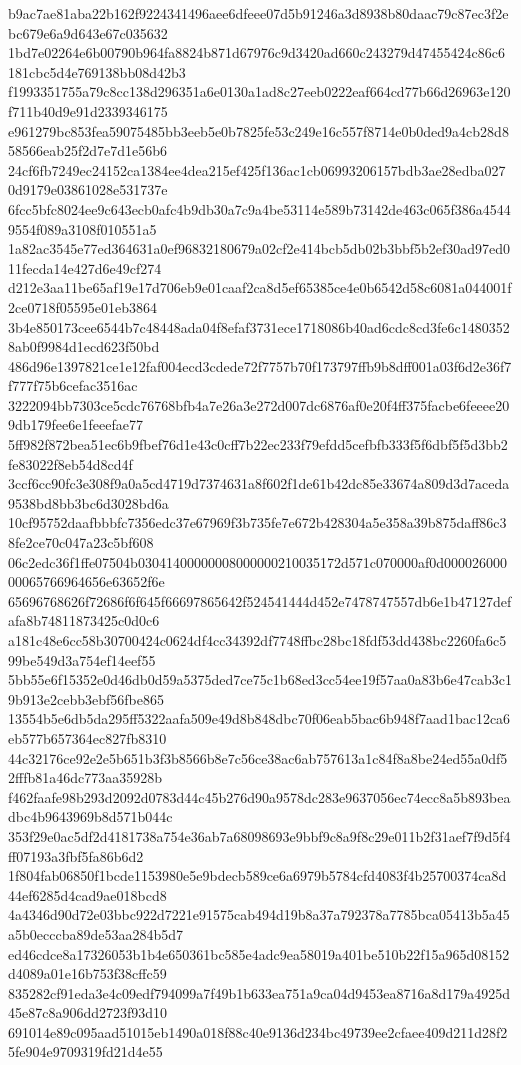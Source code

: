 {b9ac7ae81aba22b162f9224341496aee6dfeee07d5b91246a3d8938b80daac79c87ec3f2ebc679e6a9d643e67c035632
1bd7e02264e6b00790b964fa8824b871d67976c9d3420ad660c243279d47455424c86c6181cbc5d4e769138bb08d42b3
f1993351755a79c8cc138d296351a6e0130a1ad8c27eeb0222eaf664cd77b66d26963e120f711b40d9e91d2339346175
e961279bc853fea59075485bb3eeb5e0b7825fe53c249e16c557f8714e0b0ded9a4cb28d858566eab25f2d7e7d1e56b6
24cf6fb7249ec24152ca1384ee4dea215ef425f136ac1cb06993206157bdb3ae28edba0270d9179e03861028e531737e
6fcc5bfc8024ee9c643ecb0afc4b9db30a7c9a4be53114e589b73142de463c065f386a45449554f089a3108f010551a5
1a82ac3545e77ed364631a0ef96832180679a02cf2e414bcb5db02b3bbf5b2ef30ad97ed011fecda14e427d6e49cf274
d212e3aa11be65af19e17d706eb9e01caaf2ca8d5ef65385ce4e0b6542d58c6081a044001f2ce0718f05595e01eb3864
3b4e850173cee6544b7c48448ada04f8efaf3731ece1718086b40ad6cdc8cd3fe6c14803528ab0f9984d1ecd623f50bd
486d96e1397821ce1e12faf004ecd3cdede72f7757b70f173797ffb9b8dff001a03f6d2e36f7f777f75b6cefac3516ac
3222094bb7303ce5cdc76768bfb4a7e26a3e272d007dc6876af0e20f4ff375facbe6feeee209db179fee6e1feeefae77
5ff982f872bea51ec6b9fbef76d1e43c0cff7b22ec233f79efdd5cefbfb333f5f6dbf5f5d3bb2fe83022f8eb54d8cd4f
3ccf6cc90fc3e308f9a0a5cd4719d7374631a8f602f1de61b42dc85e33674a809d3d7aceda9538bd8bb3bc6d3028bd6a
10cf95752daafbbbfc7356edc37e67969f3b735fe7e672b428304a5e358a39b875daff86c38fe2ce70c047a23c5bf608
06c2edc36f1ffe07504b03041400000008000000210035172d571c070000af0d00002600000065766964656e63652f6e
65696768626f72686f6f645f66697865642f524541444d452e7478747557db6e1b47127defafa8b74811873425c0d0c6
a181c48e6cc58b30700424c0624df4cc34392df7748ffbc28bc18fdf53dd438bc2260fa6c599be549d3a754ef14eef55
5bb55e6f15352e0d46db0d59a5375ded7ce75c1b68ed3cc54ee19f57aa0a83b6e47cab3c19b913e2cebb3ebf56fbe865
13554b5e6db5da295ff5322aafa509e49d8b848dbc70f06eab5bac6b948f7aad1bac12ca6eb577b657364ec827fb8310
44c32176ce92e2e5b651b3f3b8566b8e7c56ce38ac6ab757613a1c84f8a8be24ed55a0df52fffb81a46dc773aa35928b
f462faafe98b293d2092d0783d44c45b276d90a9578dc283e9637056ec74ecc8a5b893beadbc4b9643969b8d571b044c
353f29e0ac5df2d4181738a754e36ab7a68098693e9bbf9c8a9f8c29e011b2f31aef7f9d5f4ff07193a3fbf5fa86b6d2
1f804fab06850f1bcde1153980e5e9bdecb589ce6a6979b5784cfd4083f4b25700374ca8d44ef6285d4cad9ae018bcd8
4a4346d90d72e03bbc922d7221e91575cab494d19b8a37a792378a7785bca05413b5a45a5b0ecccba89de53aa284b5d7
ed46cdce8a17326053b1b4e650361bc585e4adc9ea58019a401be510b22f15a965d08152d4089a01e16b753f38cffc59
835282cf91eda3e4c09edf794099a7f49b1b633ea751a9ca04d9453ea8716a8d179a4925d45e87c8a906dd2723f93d10
691014e89c095aad51015eb1490a018f88c40e9136d234bc49739ee2cfaee409d211d28f25fe904e9709319fd21d4e55
}
